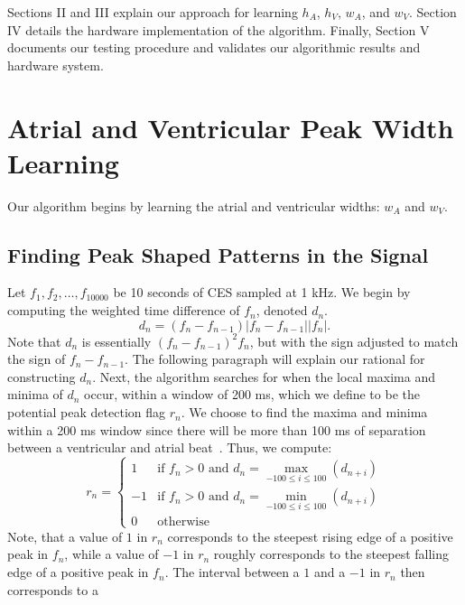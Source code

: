 \documentclass[conference]{IEEEtran}
\newcommand{\APW}{\ensuremath{w_A}}
\newcommand{\VPW}{\ensuremath{w_V}}
\newcommand{\APH}{\ensuremath{h_A}}
\newcommand{\VPH}{\ensuremath{h_V}}
\begin{document}
Sections II and III explain our approach
for learning \APH{}, \VPH{}, \APW{}, and \VPW{}. Section IV
details the hardware implementation of the algorithm.
Finally, Section V documents our testing procedure and
validates our algorithmic results and hardware system.

\section{Atrial and Ventricular Peak Width Learning}
Our algorithm begins by learning the atrial and ventricular widths: \APW{} and \VPW{}.

\subsection{Finding Peak Shaped Patterns in the Signal}
Let $f_1, f_2, \dots, f_{10000}$ be 10 seconds of CES sampled at 1 kHz.
We begin by computing the weighted time
difference of $f_n$, denoted $d_n$.
\begin{equation*}
	d_n=(f_n-f_{n-1})\left|f_n - f_{n-1}\right| \left|f_n\right|.
\end{equation*}
Note that $d_n$ is essentially $(f_n-f_{n-1})^2  f_n$, but with the sign adjusted to match the sign of $f_n-f_{n-1}$.
The following paragraph will explain our rational for constructing $d_n$. Next, the algorithm 
searches for when the local
maxima and minima of $d_n$ occur, within a window of
200 ms, which we define to be the potential peak detection flag $r_n$.  
We choose to find the maxima and minima within a 200 ms window since there will be more than 100 ms of separation between a ventricular 
and atrial beat~\cite{cardiac-cycle}. Thus, we compute:
\begin{equation*}
	r_n = \left \{
		\begin{array}{lc}
			1 & \text{if } f_n>0 \text{ and } d_n = \max\limits_{-100 \le i \le 100} (d_{n+i}) \\
			-1 & \text{if } f_n>0 \text{ and }  d_n = \min\limits_{-100 \le i \le 100} (d_{n+i}) \\
			0 & \text{otherwise}
		\end{array}
	\right.
\end{equation*}
Note, that a value of $1$ in $r_n$ corresponds to the
steepest rising edge of a positive peak in $f_n$, while a value of $-1$
in $r_n$ roughly corresponds to the steepest falling edge of a positive peak
in $f_n$. 
The interval between a $1$ and a $-1$ in $r_n$ then corresponds to a
\end{document}
